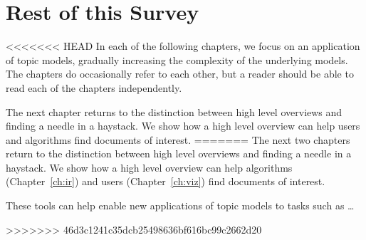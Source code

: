 \section{Rest of this Survey}

<<<<<<< HEAD
In each of the following chapters, we focus on an application of topic
models, gradually increasing the complexity of the underlying models.
The chapters do occasionally refer to each other, but a reader should
be able to read each of the chapters independently.

The next chapter returns to the distinction between high level
overviews and finding a needle in a haystack.  We show how a high
level overview can help users and algorithms find documents of
interest.
=======
The next two chapters return to the distinction between high level overviews and
finding a needle in a haystack.  We show how a high level overview can help
algorithms (Chapter~\ref{ch:ir}) and users (Chapter~\ref{ch:viz}) find documents
of interest.

These tools can help enable new applications of topic models to tasks such as
\dots

>>>>>>> 46d3c1241c35dcb25498636bf616bc99c2662d20
